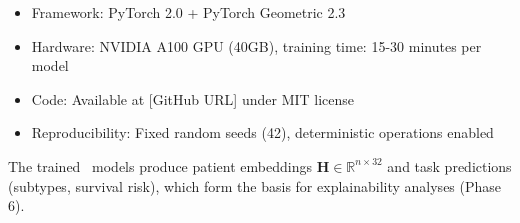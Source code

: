 \begin{itemize}
    \item Framework: PyTorch 2.0\cite{paszke2019pytorch} + PyTorch Geometric 2.3\cite{fey2019fast}
    \item Hardware: NVIDIA A100 GPU (40GB), training time: 15-30 minutes per model
    \item Code: Available at [GitHub URL] under MIT license
    \item Reproducibility: Fixed random seeds (42), deterministic operations enabled
\end{itemize}

The trained \giman\ models produce patient embeddings $\mathbf{H} \in \mathbb{R}^{n \times 32}$ and task predictions (subtypes, survival risk), which form the basis for explainability analyses (Phase 6).
